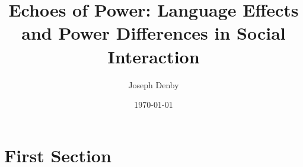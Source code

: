 \documentclass{beamer}
\title[Echoes of Power]{Echoes of Power: Language Effects and Power Differences in Social Interaction} %
\author{Joseph Denby} %
\institute[] %
{
Computational Content Analysis \\ %
\medskip
}
\date{\today} %
\begin{document}
\begin{frame}
\titlepage %
\end{frame}



\section{First Section} %



\end{document}
